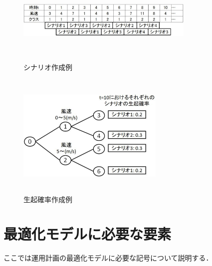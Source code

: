 \documentclass[a4paper,12pt,showkeys]{jreport}
\begin{document}
\begin{figure}[h]
 \begin{minipage}{0.5\hsize}
  \begin{center}
  \includegraphics[width=8.5cm,height=3.5cm, clip]{kakuritsu1.eps}
  \end{center}
  \caption{シナリオ作成例}
  \label{fig:kakuritsu1}
 \end{minipage}
 \begin{minipage}{0.5\hsize}
  \begin{center}
  \includegraphics[width=7cm,height=6cm, clip]{kakuritsu2.eps}
  \end{center}
  \caption{生起確率作成例}
  \label{fig:kakuritsu2}
 \end{minipage}
\end{figure}

\section{最適化モデルに必要な要素}
ここでは運用計画の最適化モデルに必要な記号について説明する．
\end{document}
